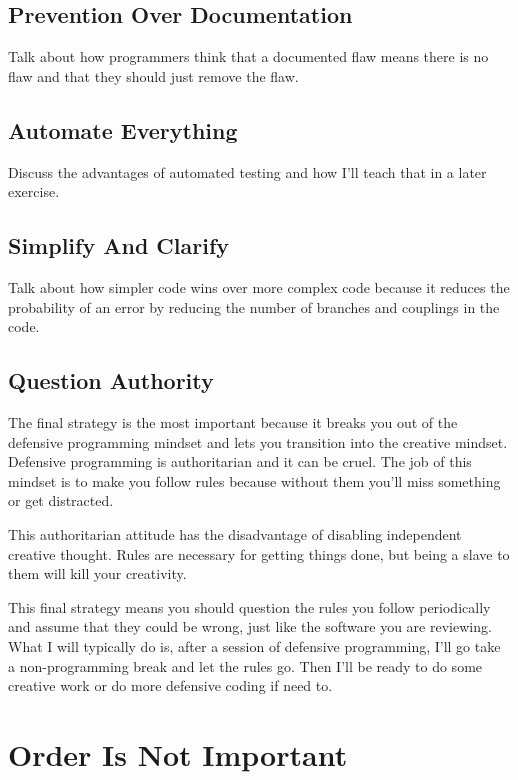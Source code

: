 \subsection{Prevention Over Documentation}

Talk about how programmers think that a documented flaw means there is no flaw and that they
should just remove the flaw.

\subsection{Automate Everything}

Discuss the advantages of automated testing and how I'll teach that in a later exercise.

\subsection{Simplify And Clarify}

Talk about how simpler code wins over more complex code because it reduces the probability of
an error by reducing the number of branches and couplings in the code.

\subsection{Question Authority}

The final strategy is the most important because it breaks you out of the
defensive programming mindset and lets you transition into the creative
mindset.  Defensive programming is authoritarian and it can be cruel.  The
job of this mindset is to make you follow rules because without them you'll
miss something or get distracted.

This authoritarian attitude has the disadvantage of disabling independent 
creative thought.  Rules are necessary for getting things done, but being
a slave to them will kill your creativity.

This final strategy means you should question the rules you follow periodically
and assume that they could be wrong, just like the software you are reviewing.
What I will typically do is, after a session of defensive programming, I'll go
take a non-programming break and let the rules go.  Then I'll be ready to do
some creative work or do more defensive coding if need to.

\section{Order Is Not Important}


